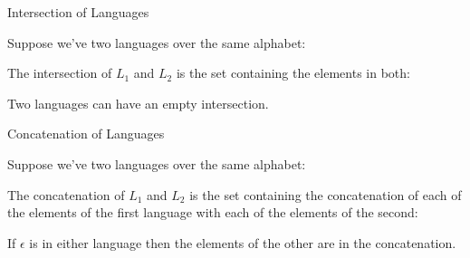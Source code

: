 \begin{frame}{Intersection of Languages}

  \vspace{2mm}

  Suppose we've two languages over the same alphabet:


  

  \vspace{2mm}

  The intersection of $L_1$ and $L_2$ is the set containing the elements in both:


  \vspace{2mm}

  Two languages can have an empty intersection.

\end{frame}

\begin{frame}{Concatenation of Languages}

  \vspace{2mm}

  Suppose we've two languages over the same alphabet:


  

  \vspace{2mm}

  The concatenation of $L_1$ and $L_2$ is the set containing the concatenation of each of the elements of the first language with each of the elements of the second:


  \vspace{2mm}

  If $\epsilon$ is in either language then the elements of the other are in the concatenation.

\end{frame}


